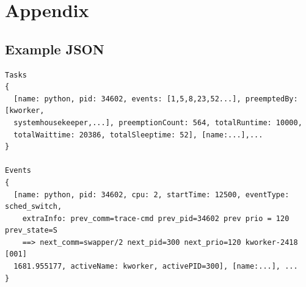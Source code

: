 \documentclass{hmcclinic}
\begin{document}
\chapter{Appendix}
\newpage
\appendix
\section{Example JSON} \label{App:AppendixA}

\begin{verbatim}
Tasks
{
  [name: python, pid: 34602, events: [1,5,8,23,52...], preemptedBy: [kworker,
  systemhousekeeper,...], preemptionCount: 564, totalRuntime: 10000,
  totalWaittime: 20386, totalSleeptime: 52], [name:...],...   
}

Events
{
  [name: python, pid: 34602, cpu: 2, startTime: 12500, eventType: sched_switch,
    extraInfo: prev_comm=trace-cmd prev_pid=34602 prev prio = 120 prev_state=S
    ==> next_comm=swapper/2 next_pid=300 next_prio=120 kworker-2418 [001]
  1681.955177, activeName: kworker, activePID=300], [name:...], ...
}

\end{verbatim}
\end{document}
